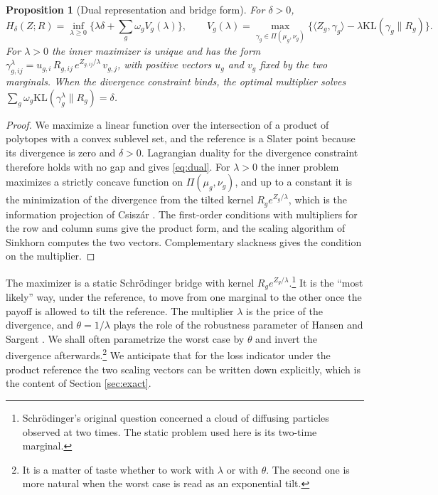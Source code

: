 \documentclass[11pt,a4paper]{article}
\theoremstyle{notesplain}
\newtheorem{proposition}[theorem]{Proposition}
\theoremstyle{notesupright}
\numberwithin{equation}{section}
\newcommand{\KL}{\mathrm{KL}}
\begin{document}
\begin{proposition}[Dual representation and bridge form]
\label{prop:dual}
For $\delta>0$,
\begin{equation}
H_\delta(Z;R)=\inf_{\lambda\ge0}\Big\{\lambda\delta+\sum_g\omega_g V_g(\lambda)\Big\},\qquad V_g(\lambda)=\max_{\gamma_g\in\Pi(\mu_g,\nu_g)}\big\{\langle Z_g,\gamma_g\rangle-\lambda\KL(\gamma_g\|R_g)\big\}.
\label{eq:dual}
\end{equation}
For $\lambda>0$ the inner maximizer is unique and has the form $\gamma^\lambda_{g,ij}=u_{g,i}\,R_{g,ij}\,e^{Z_{g,ij}/\lambda}\,v_{g,j}$, with positive vectors $u_g$ and $v_g$ fixed by the two marginals. When the divergence constraint binds, the optimal multiplier solves $\sum_g\omega_g\KL(\gamma^\lambda_g\|R_g)=\delta$.
\end{proposition}

\begin{proof}
We maximize a linear function over the intersection of a product of polytopes with a convex sublevel set, and the reference is a Slater point because its divergence is zero and $\delta>0$. Lagrangian duality for the divergence constraint therefore holds with no gap and gives \eqref{eq:dual}. For $\lambda>0$ the inner problem maximizes a strictly concave function on $\Pi(\mu_g,\nu_g)$, and up to a constant it is the minimization of the divergence from the tilted kernel $R_ge^{Z_g/\lambda}$, which is the information projection of Csiszár \cite{csiszar}. The first-order conditions with multipliers for the row and column sums give the product form, and the scaling algorithm of Sinkhorn \cite{sinkhorn} computes the two vectors. Complementary slackness gives the condition on the multiplier.
\end{proof}

The maximizer is a static Schrödinger bridge with kernel $R_ge^{Z_g/\lambda}$.\footnote{Schrödinger's original question concerned a cloud of diffusing particles observed at two times. The static problem used here is its two-time marginal.} It is the ``most likely'' way, under the reference, to move from one marginal to the other once the payoff is allowed to tilt the reference. The multiplier $\lambda$ is the price of the divergence, and $\theta=1/\lambda$ plays the role of the robustness parameter of Hansen and Sargent \cite{hansensargent2008}. We shall often parametrize the worst case by $\theta$ and invert the divergence afterwards.\footnote{It is a matter of taste whether to work with $\lambda$ or with $\theta$. The second one is more natural when the worst case is read as an exponential tilt.} We anticipate that for the loss indicator under the product reference the two scaling vectors can be written down explicitly, which is the content of Section \ref{sec:exact}.
\end{document}
